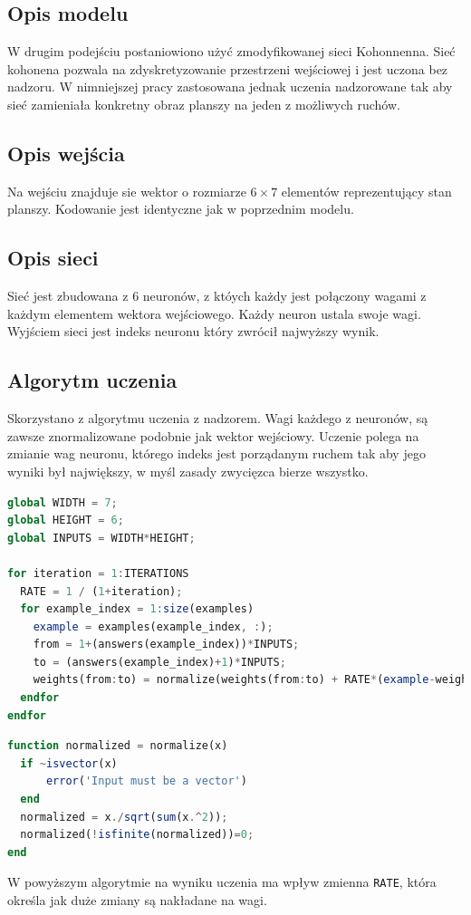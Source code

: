 \documentclass{llncs}
\begin{document}
\subsection{Opis modelu}
W drugim podejściu postaniowiono użyć zmodyfikowanej sieci Kohonnenna. Sieć kohonena pozwala na zdyskretyzowanie przestrzeni wejściowej i jest uczona bez nadzoru.
W nimniejszej pracy zastosowana jednak uczenia nadzorowane tak aby sieć zamieniała konkretny obraz planszy na jeden z możliwych ruchów.

\subsection{Opis wejścia}
Na wejściu znajduje sie wektor o rozmiarze $6\times 7$ elementów reprezentujący stan planszy. Kodowanie jest identyczne jak w poprzednim modelu.

\subsection{Opis sieci}
Sieć jest zbudowana z $6$ neuronów, z któych każdy jest połączony wagami z każdym elementem wektora wejściowego. 
Każdy neuron ustala swoje wagi. Wyjściem sieci jest indeks neuronu który zwrócił najwyższy wynik.

\subsection{Algorytm uczenia}
Skorzystano z algorytmu uczenia z nadzorem. Wagi każdego z neuronów, są zawsze znormalizowane podobnie jak wektor wejściowy.
Uczenie polega na zmianie wag neuronu, którego indeks jest porządanym ruchem tak aby jego wyniki był największy, w myśl zasady
zwycięzca bierze wszystko.


\begin{lstlisting}[language=Octave,frame=single,caption=Implementacja algorytmu w języku Octave]
global WIDTH = 7;
global HEIGHT = 6;
global INPUTS = WIDTH*HEIGHT;

for iteration = 1:ITERATIONS
  RATE = 1 / (1+iteration);
  for example_index = 1:size(examples)
    example = examples(example_index, :);
    from = 1+(answers(example_index))*INPUTS;
    to = (answers(example_index)+1)*INPUTS;
    weights(from:to) = normalize(weights(from:to) + RATE*(example-weights(from:to)));
  endfor
endfor
\end{lstlisting}
\begin{lstlisting}[language=Octave,frame=single,caption=Implementacja normalizacji w języku Octave]
function normalized = normalize(x)
  if ~isvector(x)
      error('Input must be a vector')
  end
  normalized = x./sqrt(sum(x.^2));
  normalized(!isfinite(normalized))=0;
end
\end{lstlisting}
W powyższym algorytmie na wyniku uczenia ma wpływ zmienna \texttt{RATE}, która określa jak duże zmiany są nakładane na wagi.
\end{document}
